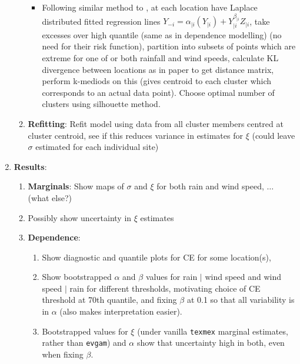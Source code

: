 \documentclass{article}
\numberwithin{equation}{section}
\begin{document}
\begin{enumerate}
\begin{enumerate}
\begin{itemize}
          \item Following similar method to \cite{Vignotto2021}, at each location have Laplace distributed fitted regression lines $Y_{-i} = \alpha_{\mid i}(Y_{\mid i}) + Y_{\mid i}^{\beta_{\mid i}} Z_{\mid i}$, take excesses over high quantile (same as in dependence modelling) (no need for their risk function), partition into subsets of points which are extreme for one of or both rainfall and wind speeds, calculate KL divergence between locations as in paper to get distance matrix, perform k-mediods on this (gives centroid to each cluster which corresponds to an actual data point). Choose optimal number of clusters using silhouette method. 
        \end{itemize}
      \item \textbf{Refitting}: Refit model using data from all cluster members centred at cluster centroid, see if this reduces variance in estimates for $\xi$ (could leave $\sigma$ estimated for each individual site) 
    \end{enumerate}
  \item \textbf{Results}: 
    \begin{enumerate}
      \item \textbf{Marginals}: Show maps of $\sigma$ and $\xi$ for both rain and wind speed, $\ldots$ (what else?)
      \item Possibly show uncertainty in $\xi$ estimates
      \item \textbf{Dependence}:
        \begin{enumerate}
          \item Show diagnostic and quantile plots for CE for some location(s),
          \item Show bootstrapped $\alpha$ and $\beta$ values for rain $\mid$ wind speed and wind speed $\mid$ rain for different thresholds, motivating choice of CE threshold at 70th quantile, and fixing $\beta$ at 0.1 so that all variability is in $\alpha$ (also makes interpretation easier). 
          \item Bootstrapped values for $\xi$ (under vanilla \texttt{texmex} marginal estimates, rather than \texttt{evgam}) and $\alpha$ show that uncertainty high in both, even when fixing $\beta$. 

\end{enumerate}
\end{enumerate}
\end{enumerate}
\end{document}
